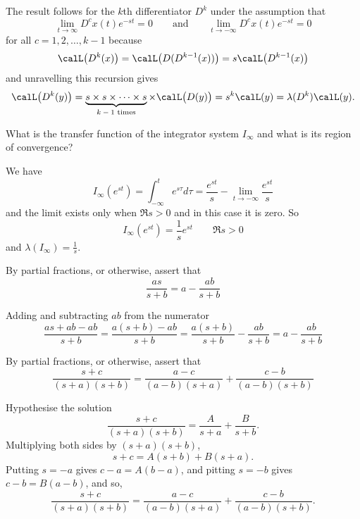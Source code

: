 \begin{excersizelist}
\begin{solution}
The result follows for the $k$th differentiator $D^k$ under the assumption that
\[
\lim_{t\to\infty} D^{c}x(t) e^{-st} = 0 \qquad \text{and} \qquad \lim_{t\to-\infty} D^{c}x(t) e^{-st} = 0
\]
for all $c = 1, 2, \dots, k-1$ because
\[
\calL\big( D^k(x) \big) = \calL\big( D(D^{k-1}(x)) \big) = s \calL\big( D^{k-1}(x) \big)
\]
and unravelling this recursion gives
\[
\calL\big( D^k(y) \big) = \underbrace{s \times s \times \dots \times s}_{\text{$k-1$ times}} \times \calL\big( D(y) \big) = s^k \calL( y ) = \lambda(D^k)\calL(y).
\]
\end{solution}


\item What is the transfer function of the integrator system $I_\infty$ and what is its region of convergence? 
\begin{solution}
We have
\[
I_\infty(e^{st}) = \int_{-\infty}^t e^{s\tau} d\tau = \frac{e^{st}}{s} - \lim_{t\to -\infty}\frac{e^{st}}{s}
\]
and the limit exists only when $\Re{s} > 0$ and in this case it is zero.  So
\[
I_\infty(e^{st}) = \frac{1}{s} e^{st} \qquad \Re{s} > 0
\]
and $\lambda(I_\infty) = \tfrac{1}{s}$.
\end{solution}


\item \label{exer:partialfracfirstorder} By partial fractions, or otherwise, assert that
\[
\frac{as}{s+b} = a - \frac{ab}{s+b}
\]
\begin{solution}
Adding and subtracting $ab$ from the numerator
\[
\frac{as+ab-ab}{s+b} = \frac{a(s+b)-ab}{s+b} = \frac{a(s+b)}{s+b} - \frac{ab}{s+b} = a - \frac{ab}{s+b}
\]
\end{solution}

\item \label{exer:partialfracsecondorder} By partial fractions, or otherwise, assert that
\[
\frac{s + c}{(s+a)(s+b)} = \frac{a-c}{(a-b)(s+a)} + \frac{c-b}{(a-b)(s+b)}
\]
\begin{solution}
Hypothesise the solution
\[
\frac{s + c}{(s+a)(s+b)} = \frac{A}{s+a} + \frac{B}{s+b}.
\]
Multiplying both sides by $(s+a)(s+b)$,
\[
s+c = A(s+b) + B(s+a).
\]
Putting $s = -a$ gives $c-a = A(b-a)$, and pitting $s=-b$ gives $c-b = B(a-b)$, and so,
\[
\frac{s+c}{(s+a)(s+b)} = \frac{a-c}{(a-b)(s+a)} + \frac{c-b}{(a-b)(s+b)}.
\]
\end{solution}


\end{excersizelist}
